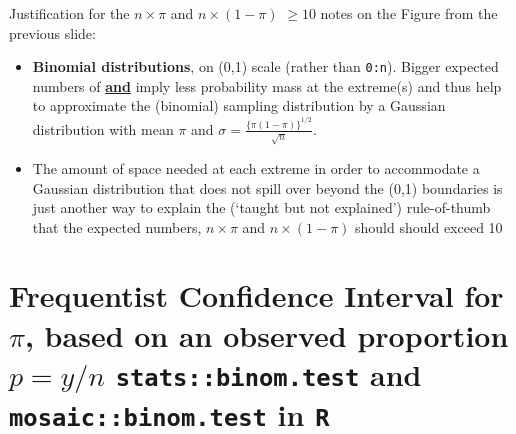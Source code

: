 \documentclass[10pt]{beamer}\usepackage[]{graphicx}\usepackage[]{color}
\begin{document}
\begin{frame}
\end{frame}



\begin{frame}{Justification for the $n \times \pi$ and $n \times (1-\pi)$ $\geq 10$ }
	notes on the Figure from the previous slide:
	\begin{itemize}
		\setlength\itemsep{1em}
		\item \textbf{Binomial distributions}, on (0,1) scale (rather than \texttt{0:n}). Bigger  expected numbers of {  } \textbf{\underline{and}} { } imply less probability mass at the extreme(s) and thus help to approximate the (binomial) sampling distribution by a Gaussian distribution with mean $\pi$ and 
		$\sigma = \frac{ \{\pi(1-\pi)\}^{1/2}}{\sqrt{n}}.$
		\item The amount of space needed at each extreme in order to accommodate a Gaussian distribution that does not spill over beyond the (0,1) boundaries is just another way to explain the (`taught but not explained')  rule-of-thumb that the expected numbers, $n \times \pi$ and $n \times (1-\pi)$ should should exceed 10 
	\end{itemize}
\end{frame}


\section{Frequentist Confidence Interval for $\pi$, based on an observed proportion $p = y/n$ \texttt{stats::binom.test} and \texttt{mosaic::binom.test} in \texttt{R}}
\end{document}

